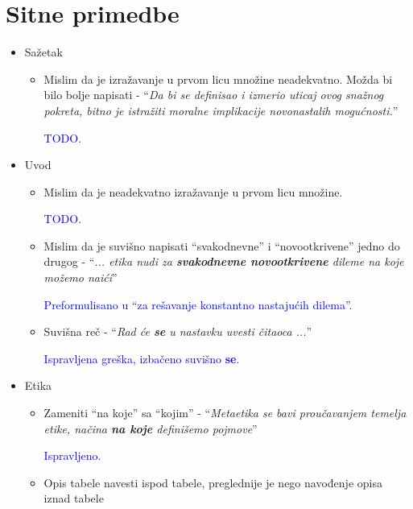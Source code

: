 \documentclass[a4paper]{report}
\newcommand{\odgovor}[1]{\textcolor{blue}{#1}}
\begin{document}
\section{Sitne primedbe}
\begin{itemize}
    \item Sažetak
    \begin{itemize}
        \item Mislim da je izražavanje u prvom licu množine neadekvatno. Možda bi bilo bolje napisati - ``\textit{Da bi se definisao i izmerio uticaj ovog snažnog pokreta, bitno je istražiti moralne implikacije novonastalih mogućnosti.}''
        
        \odgovor{TODO.}
        
    \end{itemize}
    \item Uvod
    \begin{itemize}
        \item Mislim da je neadekvatno izražavanje u prvom licu množine.
        
        \odgovor{TODO.}
        
        \item Mislim da je suvišno napisati ``svakodnevne'' i ``novootkrivene'' jedno do drugog - ``\textit{... etika nudi za \textbf{svakodnevne novootkrivene} dileme na koje možemo naići}''

        \odgovor{Preformulisano u ``za rešavanje konstantno nastajućih dilema''.}
                
        \item Suvišna reč - ``\textit{Rad će \textbf{se} u nastavku uvesti čitaoca ...}''
        
        \odgovor{Ispravljena greška, izbačeno suvišno \textbf{se}.}
        
    \end{itemize}
    \item Etika
    \begin{itemize}
        \item Zameniti ``na koje'' sa ``kojim'' - ``\textit{Metaetika se bavi proučavanjem temelja etike, načina \textbf{na koje} definišemo pojmove}''
        
        \odgovor{Ispravljeno.}
        
        \item Opis tabele navesti ispod tabele, preglednije je nego navođenje opisa iznad tabele
        

\end{itemize}
\end{itemize}
\end{document}
